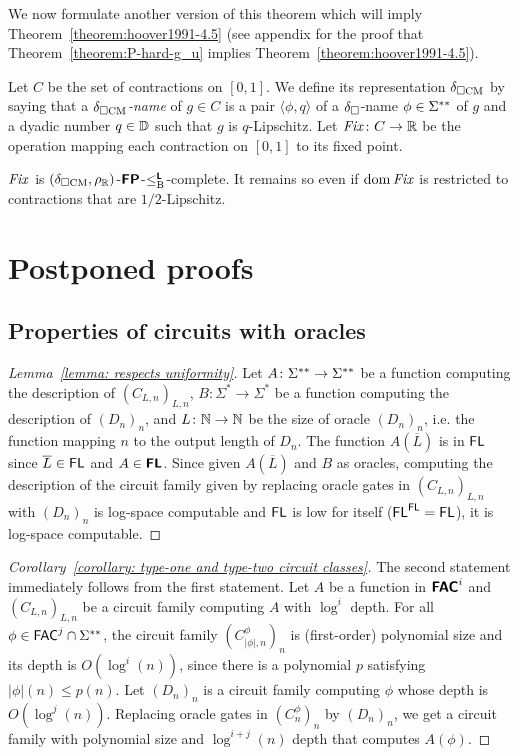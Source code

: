 \documentclass[envcountsect,envcountsame,orivec,oribibl]{llncs}
\begin{document}
We now formulate another version of this theorem which 
will imply Theorem~\ref{theorem:hoover1991-4.5}
(see appendix for the proof that Theorem~\ref{theorem:P-hard-g_u} 
implies Theorem~\ref{theorem:hoover1991-4.5}). 

Let $C$ be the set of contractions on $[0, 1]$. 
We define its representation $\delta _{\square \mathrm{CM}}$ by saying that 
a \emph{$\delta _{\square \mathrm{CM}}$-name} of $g \in C$
is a pair $\langle \phi, q \rangle$ of 
a $\delta _\square$-name $\phi \in \Sigma ^{**}$ of $g$ 
and a dyadic number $q \in \mathbb D$ such that $g$ is $q$-Lipschitz. 
Let $\mathit{Fix} \colon C \to \mathbb R$ be the operation 
mapping each contraction on $[0, 1]$ to its fixed point.

\begin{theorem}
\label{theorem:P-hard-g_u}
$\mathit{Fix}$ is $(\delta _{\square \mathrm{CM}}, \rho _\mathbb R)$-$\text{\bfseries \sffamily \upshape FP}$-$\leq _{\mathrm B} ^{\text{\bfseries \sffamily \upshape L}}$-complete. 
It remains so even if $\mathop{\rm dom} \mathit{Fix}$ is restricted to contractions 
that are $1/2$-Lipschitz.
\end{theorem}




\clearpage
\appendix
\section{Postponed proofs}

\subsection{Properties of circuits with oracles}

\begin{proof}[Lemma~\ref{lemma: respects uniformity}]
 Let $A \colon \Sigma ^{**} \to \Sigma ^{**}$ be a function computing the description of $(C_{L,n})_{L,n}$,
 $B \colon \Sigma^* \to \Sigma^*$ be a function computing the description of $(D_n)_n$, and
 $L \colon \mathbb N \to \mathbb N$ be the size of oracle $(D_n)_n$, i.e.
 the function mapping $n$ to the output length of $D_n$.
 The function $A(\overline{L})$ is in $\mathsf{FL}$ since $\overline{L} \in \mathsf{FL}$ and $A \in \text{\bfseries \sffamily \upshape FL}$.
 Since given $A(\overline{L})$ and $B$ as oracles,
 computing the description of the circuit family given by replacing oracle
 gates in $(C_{L,n})_{L,n}$ with $(D_n)_n$ is log-space computable
 and $\mathsf{FL}$ is low for itself ($\mathsf{FL}^{\mathsf{FL}} = \mathsf{FL}$),
 it is log-space computable.
\end{proof}

\begin{proof}[Corollary~\ref{corollary: type-one and type-two circuit classes}]
The second statement immediately follows from the first statement.
Let $A$ be a function in $\text{\bfseries \sffamily \upshape FAC}^i$ and $(C_{L,n})_{L,n}$ be a circuit
family computing $A$ with $\log^i$ depth.
For all $\phi \in \mathsf{FAC}^j \cap \Sigma ^{**}$, 
the circuit family $(C^\phi_{|\phi|,n})_n$ is (first-order) polynomial size and its depth is $O(\log^i(n))$,
since there is a polynomial $p$ satisfying $|\phi|(n) \le p(n)$.
Let $(D_n)_n$ is a circuit family computing $\phi$ whose depth is $O(\log^j(n))$.
Replacing oracle gates in $(C^\phi_n)_n$ by $(D_n)_n$, 
we get a circuit family with polynomial size and $\log^{i+j}(n)$ depth
that computes $A(\phi)$.
\end{proof}
\end{document}
